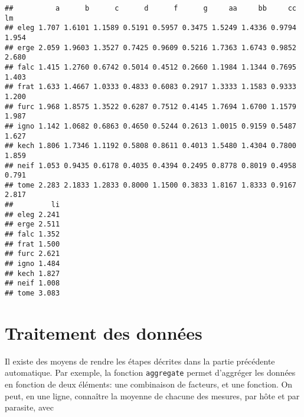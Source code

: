 \begin{knitrout}
\color{fgcolor}\begin{kframe}
\begin{flushleft}
\ttfamily\noindent
{}\hlkeyword{(}\hlkeyword{(}\hlkeyword{(}\hlkeyword{,}{\ }\hlkeyword{)}\hlkeyword{)}\hlkeyword{)}\mbox{}
\normalfont
\end{flushleft}
\begin{verbatim}
##          a      b      c      d      f      g     aa     bb     cc    lm
## eleg 1.707 1.6101 1.1589 0.5191 0.5957 0.3475 1.5249 1.4336 0.9794 1.954
## erge 2.059 1.9603 1.3527 0.7425 0.9609 0.5216 1.7363 1.6743 0.9852 2.680
## falc 1.415 1.2760 0.6742 0.5014 0.4512 0.2660 1.1984 1.1344 0.7695 1.403
## frat 1.633 1.4667 1.0333 0.4833 0.6083 0.2917 1.3333 1.1583 0.9333 1.200
## furc 1.968 1.8575 1.3522 0.6287 0.7512 0.4145 1.7694 1.6700 1.1579 1.987
## igno 1.142 1.0682 0.6863 0.4650 0.5244 0.2613 1.0015 0.9159 0.5487 1.627
## kech 1.806 1.7346 1.1192 0.5808 0.8611 0.4013 1.5480 1.4304 0.7800 1.859
## neif 1.053 0.9435 0.6178 0.4035 0.4394 0.2495 0.8778 0.8019 0.4958 0.791
## tome 2.283 2.1833 1.2833 0.8000 1.1500 0.3833 1.8167 1.8333 0.9167 2.817
##         li
## eleg 2.241
## erge 2.511
## falc 1.352
## frat 1.500
## furc 2.621
## igno 1.484
## kech 1.827
## neif 1.008
## tome 3.083
\end{verbatim}
\end{kframe}
\end{knitrout}


\section{Traitement des données}

Il existe des moyens de rendre les étapes décrites dans la partie précédente automatique.
Par exemple, la fonction \texttt{aggregate} permet d'aggréger les données en fonction de deux éléments: une combinaison de facteurs, et une fonction.
On peut, en une ligne, connaître la moyenne de chacune des mesures, par hôte et par parasite, avec

